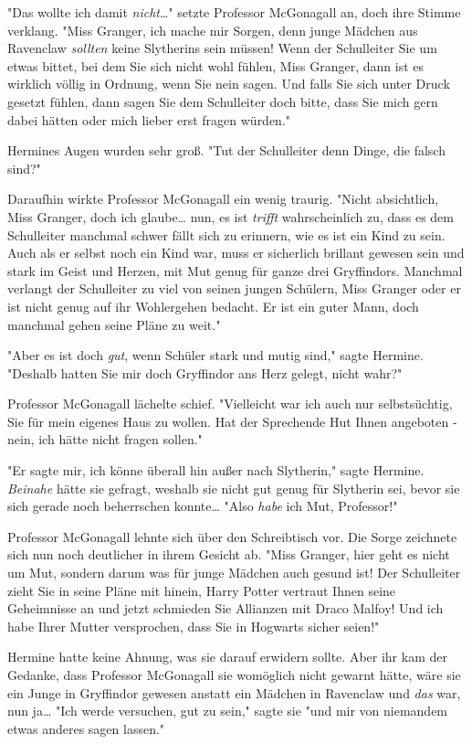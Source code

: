 {"Das wollte ich damit \emph{nicht}…" setzte Professor McGonagall an, doch ihre Stimme verklang. "Miss Granger, ich mache mir Sorgen, denn junge Mädchen aus Ravenclaw \emph{sollten} keine Slytherins sein müssen! Wenn der Schulleiter Sie um etwas bittet, bei dem Sie sich nicht wohl fühlen, Miss Granger, dann ist es wirklich völlig in Ordnung, wenn Sie nein sagen. Und falls Sie sich unter Druck gesetzt fühlen, dann sagen Sie dem Schulleiter doch bitte, dass Sie mich gern dabei hätten oder mich lieber erst fragen würden."

Hermines Augen wurden sehr groß. "Tut der Schulleiter denn Dinge, die falsch sind?"

Daraufhin wirkte Professor McGonagall ein wenig traurig. "Nicht absichtlich, Miss Granger, doch ich glaube… nun, es ist \emph{trifft} wahrscheinlich zu, dass es dem Schulleiter manchmal schwer fällt sich zu erinnern, wie es ist ein Kind zu sein. Auch als er selbst noch ein Kind war, muss er sicherlich brillant gewesen sein und stark im Geist und Herzen, mit Mut genug für ganze drei Gryffindors. Manchmal verlangt der Schulleiter zu viel von seinen jungen Schülern, Miss Granger oder er ist nicht genug auf ihr Wohlergehen bedacht. Er ist ein guter Mann, doch manchmal gehen seine Pläne zu weit."

"Aber es ist doch \emph{gut}, wenn Schüler stark und mutig sind," sagte Hermine. "Deshalb hatten Sie mir doch Gryffindor ans Herz gelegt, nicht wahr?"

Professor McGonagall lächelte schief. "Vielleicht war ich auch nur selbstsüchtig, Sie für mein eigenes Haus zu wollen. Hat der Sprechende Hut Ihnen angeboten - nein, ich hätte nicht fragen sollen."

"Er sagte mir, ich könne überall hin außer nach Slytherin," sagte Hermine. \emph{Beinahe} hätte sie gefragt, weshalb sie nicht gut genug für Slytherin sei, bevor sie sich gerade noch beherrschen konnte… "Also \emph{habe} ich Mut, Professor!"

Professor McGonagall lehnte sich über den Schreibtisch vor. Die Sorge zeichnete sich nun noch deutlicher in ihrem Gesicht ab. "Miss Granger, hier geht es nicht um Mut, sondern darum was für junge Mädchen auch gesund ist! Der Schulleiter zieht Sie in seine Pläne mit hinein, Harry Potter vertraut Ihnen seine Geheimnisse an und jetzt schmieden Sie Allianzen mit Draco Malfoy! Und ich habe Ihrer Mutter versprochen, dass Sie in Hogwarts sicher seien!"

Hermine hatte keine Ahnung, was sie darauf erwidern sollte. Aber ihr kam der Gedanke, dass Professor McGonagall sie womöglich nicht gewarnt hätte, wäre sie ein Junge in Gryffindor gewesen anstatt ein Mädchen in Ravenclaw und \emph{das} war, nun ja… "Ich werde versuchen, gut zu sein," sagte sie "und mir von niemandem etwas anderes sagen lassen."

}
